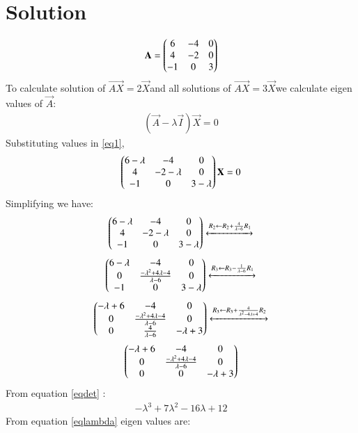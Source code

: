\documentclass[journal,12pt,twocolumn]{IEEEtran}
\begin{document}
\section{Solution}
\begin{align}
\mathbf{A}=
\begin{pmatrix}6 & -4 & 0\\
4& -2 & 0\\
-1 &0 &3\end{pmatrix}
\end{align}
To calculate solution of  $\vec{AX}=2\vec{X}$and all solutions of $\vec{AX}=3\vec{X}$we calculate eigen values of $\vec{A}$:
\begin{align}\label{eq1}
(\vec{A}-\lambda\vec{I})\vec{X}=0
\end{align}
Substituting values in \eqref{eq1},
\begin{align}
\begin{pmatrix}6-\lambda& -4 & 0\\
4 & -2-\lambda & 0\\
-1 &0 &3-\lambda\end{pmatrix}
\mathbf{X}=0
\end{align}
Simplifying we have:
\begin{align}\label{eqdet}
\begin{pmatrix}6-\lambda& -4 & 0\\
4 & -2-\lambda & 0\\
-1 &0 &3-\lambda\end{pmatrix}
\xleftrightarrow[]{R_2 \leftarrow R_2+\frac{4}{\lambda-6} R_1}\nonumber
\end{align}
\begin{align}
\begin{pmatrix}6-\lambda&-4&0\\
0&\frac{-\lambda^2+4\lambda-4}{\lambda-6}&0\\
-1&0&3-\lambda\end{pmatrix} \nonumber 
\xleftrightarrow[]{R_3 \leftarrow R_3-\frac{1}{\lambda-6}R_1}
\end{align}
\begin{align}
    \begin{pmatrix}-\lambda+6&-4&0\\
            0&\frac{-\lambda^2+4\lambda-4}{\lambda-6}&0\\
            0&\frac{4}{\lambda-6}&-\lambda+3\end{pmatrix}
    \xleftrightarrow[]{R_3 \leftarrow R_3+\frac{4}{\lambda^2-4\lambda+4}R_2}\nonumber
\end{align}
\begin{align}
    \begin{pmatrix}-\lambda+6&-4&0\\
    0&\frac{-\lambda^2+4\lambda-4}{\lambda-6}&0\\
    0&0&-\lambda+3\end{pmatrix}
\end{align}
From equation \eqref{eqdet} :
\begin{align}\label{eqlambda}
-\lambda^3+7\lambda^2-16\lambda+12
\end{align}
From equation \eqref{eqlambda} eigen values are:
\end{document}
